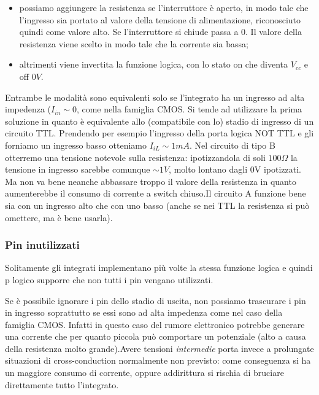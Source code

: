 \documentclass[
]{book}
\providecommand{\tightlist}{%
  \setlength{\itemsep}{0pt}\setlength{\parskip}{0pt}}
\begin{document}
\begin{itemize}
\tightlist
\item
  possiamo aggiungere la resistenza se l'interruttore è aperto, in modo
  tale che l'ingresso sia portato al valore della tensione di
  alimentazione, riconosciuto quindi come valore alto. Se l'interruttore
  si chiude passa a 0. Il valore della resistenza viene scelto in modo
  tale che la corrente sia bassa;
\item
  altrimenti viene invertita la funzione logica, con lo stato on che
  diventa \(V_{cc}\) e off \(0V\).
\end{itemize}

Entrambe le modalità sono equivalenti solo se l'integrato ha un ingresso
ad alta impedenza (\(I_{in}\sim 0\), come nella famiglia CMOS. Si tende
ad utilizzare la prima soluzione in quanto è equivalente allo
(compatibile con lo) stadio di ingresso di un circuito TTL.\newline
Prendendo per esempio l'ingresso della porta logica NOT TTL e gli
forniamo un ingresso basso otteniamo \(I_{iL}\sim 1mA\). Nel circuito di
tipo B otterremo una tensione notevole sulla resistenza: ipotizzandola
di soli \(100\Omega\) la tensione in ingresso sarebbe comunque
\(\sim 1V\), molto lontano dagli 0V ipotizzati. Ma non va bene neanche
abbassare troppo il valore della resistenza in quanto aumenterebbe il
consumo di corrente a switch chiuso.\newline Il circuito A funzione bene
sia con un ingresso alto che con uno basso (anche se nei TTL la
resistenza si può omettere, ma è bene usarla).

\subsubsection{Pin inutilizzati}\label{pin-inutilizzati}

Solitamente gli integrati implementano più volte la stessa funzione
logica e quindi p logico supporre che non tutti i pin vengano
utilizzati.

Se è possibile ignorare i pin dello stadio di uscita, non possiamo
trascurare i pin in ingresso soprattutto se essi sono ad alta impedenza
come nel caso della famiglia CMOS. Infatti in questo caso del rumore
elettronico potrebbe generare una corrente che per quanto piccola può
comportare un potenziale (alto a causa della resistenza molto
grande).\newline Avere tensioni \emph{intermedie} porta invece a
prolungate situazioni di cross-conduction normalmente non previsto: come
conseguenza si ha un maggiore consumo di corrente, oppure addirittura si
rischia di bruciare direttamente tutto l'integrato.
\end{document}
